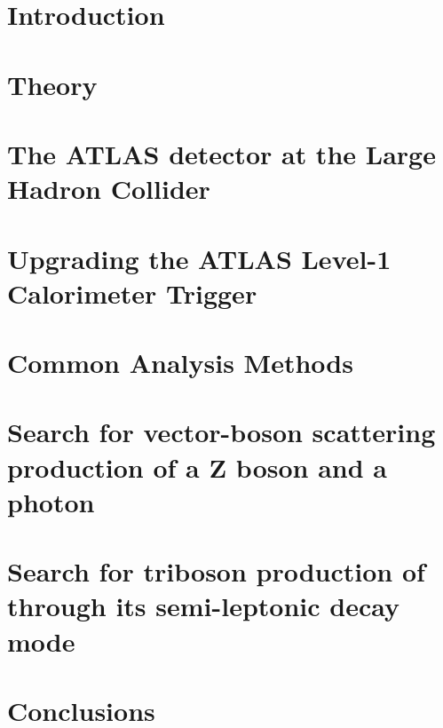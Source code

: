 \newcommand\relpath[1]{#1}
\newcommand\inputchapter[1]{}
\newcommand\resource[1]{#1}
\chapter*{Introduction}
\inputchapter{introduction}

\chapter{Theory}
\inputchapter{theory}

\chapter{The ATLAS detector at the Large Hadron Collider}
\inputchapter{detector}

\chapter{Upgrading the ATLAS Level-1 Calorimeter Trigger}
\inputchapter{l1calo}

\chapter{Common Analysis Methods}
\inputchapter{analysis-common}

\chapter{Search for vector-boson scattering production of a Z boson and a photon}
\inputchapter{vbs}

\chapter{Search for triboson production of \VZy through its semi-leptonic decay mode}
\inputchapter{vzy}

\chapter*{Conclusions}
\inputchapter{conclusion}

